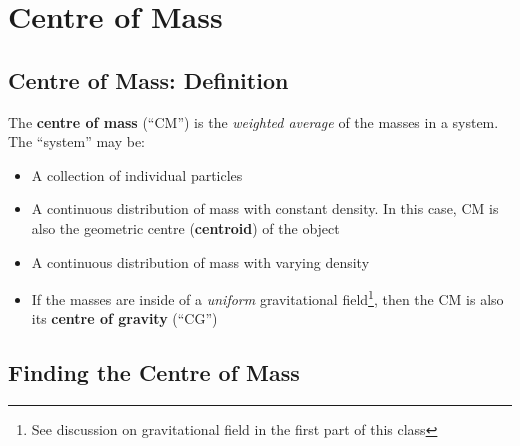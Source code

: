 %
%
\chapter{Centre of Mass}
\label{chapter:cm}

%
%
%
\section{Centre of Mass: Definition}
The \textbf{centre of mass} (``CM'') is the \emph{weighted average} of the
masses in a system. The ``system'' may be:
\begin{itemize}
\item A collection of individual particles
\item A continuous distribution of mass with constant density. In this case,
  CM is also the geometric centre (\textbf{centroid}) of the object
\item A continuous distribution of mass with varying density
\item If the masses are inside of a \emph{uniform} gravitational
  field\footnote{See discussion on gravitational field in the first part of
  this class}, then the CM is also its \textbf{centre of gravity} (``CG'')
\end{itemize}




\section{Finding the Centre of Mass}

